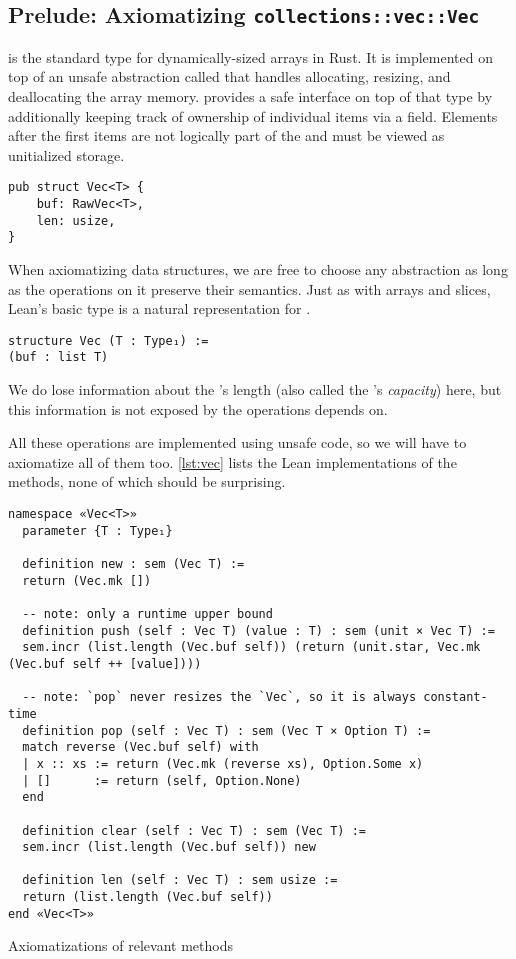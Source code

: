 \subsection{Prelude: Axiomatizing \texttt{collections::vec::Vec}}

 is the standard type for dynamically-sized arrays in Rust. It is
implemented on top of an unsafe abstraction called  that handles
allocating, resizing, and deallocating the array memory.  provides a
safe interface on top of that type by additionally keeping track of ownership of individual items
via a  field. Elements after the first  items are not
logically part of the  and must be viewed as unitialized storage.

\begin{verbatim}
pub struct Vec<T> {
    buf: RawVec<T>,
    len: usize,
}
\end{verbatim}

When axiomatizing data structures, we are free to choose any abstraction as long
as the operations on it preserve their semantics. Just as with arrays and
slices, Lean's basic  type is a natural representation for
.

\begin{verbatim}
structure Vec (T : Type₁) :=
(buf : list T)
\end{verbatim}

We do lose information about the 's length (also called the
's \emph{capacity}) here, but this information is not exposed by the
 operations  depends on.

All these operations are implemented using unsafe code, so we will have to
axiomatize all of them too. \autoref{lst:vec} lists the Lean implementations of
the  methods, none of which should be surprising.

\begin{listing}[bt!]
\begin{verbatim}
namespace «Vec<T>»
  parameter {T : Type₁}

  definition new : sem (Vec T) :=
  return (Vec.mk [])

  -- note: only a runtime upper bound
  definition push (self : Vec T) (value : T) : sem (unit × Vec T) :=
  sem.incr (list.length (Vec.buf self)) (return (unit.star, Vec.mk (Vec.buf self ++ [value])))

  -- note: `pop` never resizes the `Vec`, so it is always constant-time
  definition pop (self : Vec T) : sem (Vec T × Option T) :=
  match reverse (Vec.buf self) with
  | x :: xs := return (Vec.mk (reverse xs), Option.Some x)
  | []      := return (self, Option.None)
  end

  definition clear (self : Vec T) : sem (Vec T) :=
  sem.incr (list.length (Vec.buf self)) new

  definition len (self : Vec T) : sem usize :=
  return (list.length (Vec.buf self))
end «Vec<T>»
\end{verbatim}
  
  \caption{Axiomatizations of relevant  methods}
  \label{lst:vec}
\end{listing}

